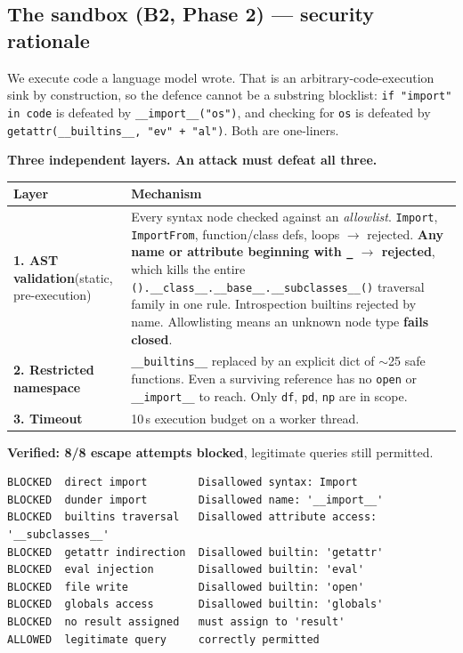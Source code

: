 \documentclass[11pt,a4paper]{article}
\begin{document}
\subsection{The sandbox (B2, Phase 2) --- security rationale}
\label{sec:sandbox}

We execute code a language model wrote. That is an arbitrary-code-execution sink by
construction, so the defence cannot be a substring blocklist: \texttt{if "import" in
code} is defeated by \texttt{\_\_import\_\_("os")}, and checking for \texttt{os} is
defeated by \texttt{getattr(\_\_builtins\_\_, "ev" + "al")}. Both are one-liners.

\textbf{Three independent layers. An attack must defeat all three.}

\begin{center}
\begin{tabularx}{\textwidth}{@{}lX@{}}
\toprule
\textbf{Layer} & \textbf{Mechanism} \\
\midrule
\textbf{1. AST validation}\newline\scriptsize(static, pre-execution) &
Every syntax node checked against an \emph{allowlist}. \texttt{Import},
\texttt{ImportFrom}, function/class defs, loops $\rightarrow$ rejected. \textbf{Any
name or attribute beginning with \texttt{\_} $\rightarrow$ rejected}, which kills the
entire \texttt{().\_\_class\_\_.\_\_base\_\_.\_\_subclasses\_\_()} traversal family in
one rule. Introspection builtins rejected by name. Allowlisting means an unknown node
type \textbf{fails closed}. \\
\addlinespace
\textbf{2. Restricted namespace} &
\texttt{\_\_builtins\_\_} replaced by an explicit dict of $\sim$25 safe functions. Even
a surviving reference has no \texttt{open} or \texttt{\_\_import\_\_} to reach. Only
\texttt{df}, \texttt{pd}, \texttt{np} are in scope. \\
\addlinespace
\textbf{3. Timeout} & 10\,s execution budget on a worker thread. \\
\bottomrule
\end{tabularx}
\end{center}

\textbf{Verified: 8/8 escape attempts blocked}, legitimate queries still permitted.

\begin{lstlisting}
BLOCKED  direct import        Disallowed syntax: Import
BLOCKED  dunder import        Disallowed name: '__import__'
BLOCKED  builtins traversal   Disallowed attribute access: '__subclasses__'
BLOCKED  getattr indirection  Disallowed builtin: 'getattr'
BLOCKED  eval injection       Disallowed builtin: 'eval'
BLOCKED  file write           Disallowed builtin: 'open'
BLOCKED  globals access       Disallowed builtin: 'globals'
BLOCKED  no result assigned   must assign to 'result'
ALLOWED  legitimate query     correctly permitted
\end{lstlisting}
\end{document}
